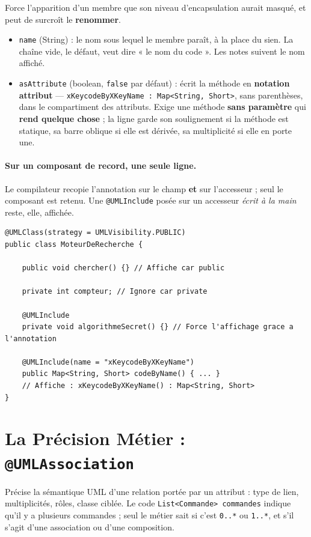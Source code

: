 \documentclass[12pt, a4paper]{article}
\begin{document}
Force l'apparition d'un membre que son niveau d'encapsulation aurait masqué, et peut de surcroît le \textbf{renommer}.
\begin{itemize}
    \item \texttt{name} (String) : le nom sous lequel le membre paraît, à la place du sien. La chaîne vide, le défaut, veut dire « le nom du code ». Les notes suivent le nom affiché.
    \item \texttt{asAttribute} (boolean, \texttt{false} par défaut) : écrit la méthode en \textbf{notation attribut} --- \texttt{xKeycodeByXKeyName : Map<String, Short>}, sans parenthèses, dans le compartiment des attributs. Exige une méthode \textbf{sans paramètre} qui \textbf{rend quelque chose} ; la ligne garde son soulignement si la méthode est statique, sa barre oblique si elle est dérivée, sa multiplicité si elle en porte une.
\end{itemize}

\paragraph{Sur un composant de record, une seule ligne.} Le compilateur recopie l'annotation sur le champ \textbf{et} sur l'accesseur ; seul le composant est retenu. Une \texttt{@UMLInclude} posée sur un accesseur \textit{écrit à la main} reste, elle, affichée.

\begin{lstlisting}
@UMLClass(strategy = UMLVisibility.PUBLIC)
public class MoteurDeRecherche {

    public void chercher() {} // Affiche car public

    private int compteur; // Ignore car private

    @UMLInclude
    private void algorithmeSecret() {} // Force l'affichage grace a l'annotation

    @UMLInclude(name = "xKeycodeByXKeyName")
    public Map<String, Short> codeByName() { ... }
    // Affiche : xKeycodeByXKeyName() : Map<String, Short>
}
\end{lstlisting}

\section{La Précision Métier : \texttt{@UMLAssociation}}

Précise la sémantique UML d'une relation portée par un attribut : type de lien, multiplicités, rôles, classe ciblée. Le code \texttt{List<Commande> commandes} indique qu'il y a plusieurs commandes ; seul le métier sait si c'est \texttt{0..*} ou \texttt{1..*}, et s'il s'agit d'une association ou d'une composition.
\end{document}
